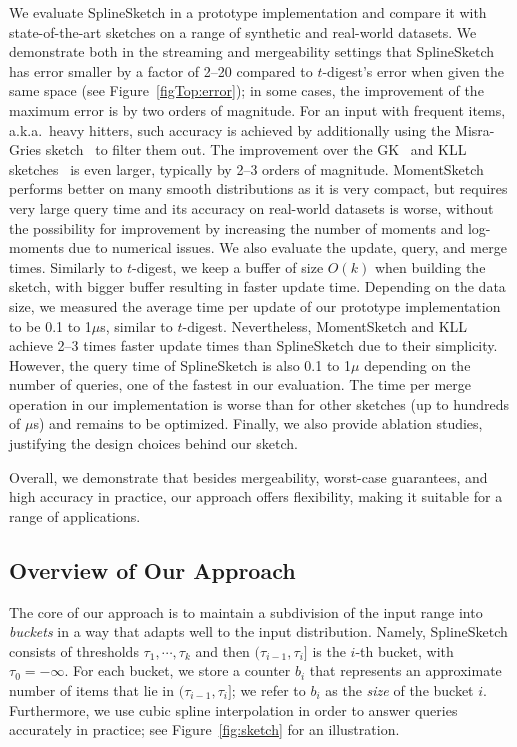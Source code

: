 \documentclass[acmsmall]{acmart}
\theoremstyle{remark}
\begin{document}
We evaluate SplineSketch in a prototype implementation and compare it with state-of-the-art sketches on a range of synthetic and real-world datasets.
We demonstrate both in the streaming and mergeability settings
that SplineSketch has error smaller by a factor of 2--20 compared to $t$-digest's error when given the same space
(see Figure~\ref{figTop:error});
in some cases, the improvement of the maximum error is by two orders of magnitude.
For an input with frequent items, a.k.a.\ heavy hitters, such accuracy is achieved by additionally using
the Misra-Gries sketch~\cite{misra1982finding} to filter them out.
The improvement over the GK~\cite{greenwald2001space} and KLL sketches~\cite{KarninLL16} is even larger, typically by 2--3 orders of magnitude.
MomentSketch~\cite{GanDTSB18} performs better on many smooth distributions as it is very compact,
but requires very large query time and its accuracy on real-world datasets is worse, without the possibility for improvement by increasing the number of moments and log-moments due to numerical issues.
We also evaluate the update, query, and merge times. Similarly to $t$-digest, we keep a buffer of size $O(k)$ when building the sketch, with bigger buffer resulting in faster update time.
Depending on the data size, we measured the average time per update of our prototype implementation to be 0.1 to 1$\mu$s, similar to $t$-digest.
Nevertheless, MomentSketch and KLL achieve 2--3 times faster update times than SplineSketch due to their simplicity.
However, the query time of SplineSketch is also 0.1 to 1$\mu$ depending on the number of queries, one of the fastest in our evaluation.
The time per merge operation in our implementation is worse than for other sketches (up to hundreds of $\mu$s) and remains to be optimized.	
Finally, we also provide ablation studies, justifying the design choices behind our sketch.

Overall, we demonstrate that besides mergeability, worst-case guarantees, and high accuracy in practice,
our approach offers flexibility, making it suitable for a range of applications.




\subsection{Overview of Our Approach}\label{sec:overview}

The core of our approach is to maintain a subdivision of the input range into \emph{buckets}
in a way that adapts well to the input distribution.
Namely, SplineSketch consists of thresholds $\tau_1, \cdots, \tau_k$ and then $(\tau_{i-1}, \tau_i]$ is the $i$-th bucket, with $\tau_0 = -\infty$.
For each bucket, we store a counter $b_i$ that represents an approximate number of items that lie in $(\tau_{i-1}, \tau_i]$;
we refer to $b_i$ as the \emph{size} of the bucket $i$.
Furthermore, we use cubic spline interpolation in order to answer queries accurately in practice;
see Figure~\ref{fig:sketch} for an illustration. %
\end{document}

